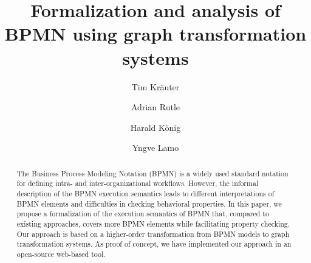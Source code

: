 \documentclass[runningheads]{lmcs}
\begin{document}
%
\title{Formalization and analysis of BPMN using graph transformation systems}
%
%
\author{Tim Kr\"{a}uter \and
Adrian Rutle \and
Harald K\"{o}nig \and
Yngve Lamo}

%
\maketitle              %
%
\begin{abstract}
The Business Process Modeling Notation (BPMN) is a widely used standard notation for defining intra- and inter-organizational workflows.
However, the informal description of the BPMN execution semantics leads to different interpretations of BPMN elements and difficulties in checking behavioral properties.
In this paper, we propose a formalization of the execution semantics of BPMN that, compared to existing approaches, covers more BPMN elements while facilitating property checking.
Our approach is based on a higher-order transformation from BPMN models to graph transformation systems.
As proof of concept, we have implemented our approach in an open-source web-based tool.

\end{abstract}
\end{document}
